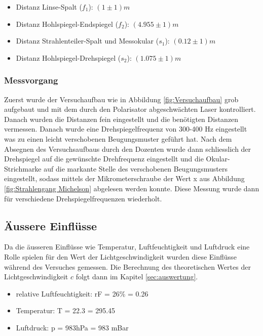 \begin{itemize}
\item Distanz Linse-Spalt ($f_{1}$): $(1\pm 1)m$
\item Distanz Hohlspiegel-Endspiegel ($f_{2}$): $(4.955\pm 1)m$
\item Distanz Strahlenteiler-Spalt und Messokular ($s_{1}$): $(0.12\pm 1)m$
\item Distanz Hohlspiegel-Drehspiegel ($s_{2}$): $(1.075\pm 1)m$
\end{itemize}

\subsubsection{Messvorgang}

Zuerst wurde der Versuchaufbau wie in Abbildung \ref{fig:Versuchaufbau} grob aufgebaut und mit dem durch den Polarisator abgeschwächten Laser kontrolliert. Danach wurden die Distanzen fein eingestellt und die benötigten Distanzen vermessen. Danach wurde eine Drehspiegelfrequenz von 300-400 Hz eingestellt was zu einen leicht verschobenen Beugungsmuster geführt hat. Nach dem Absegnen des Versuchsaufbaus durch den Dozenten wurde dann schliesslich der Drehspiegel auf die gewünschte Drehfrequenz eingestellt und die Okular-Strichmarke auf die markante Stelle des verschobenen Beugungsmusters eingestellt, sodass mittels der Mikrometerschraube der Wert x aus Abbildung \ref{fig:Strahlengang Michelson} abgelesen werden konnte. Diese Messung wurde dann für verschiedene Drehspiegelfrequenzen wiederholt.

\subsection{Äussere Einflüsse}

Da die äusseren Einflüsse wie Temperatur, Luftfeuchtigkeit und Luftdruck eine Rolle spielen für den Wert der Lichtgeschwindigkeit wurden diese Einflüsse während des Versuches gemessen. Die Berechnung des theoretischen Wertes der Lichtgeschwindigkeit $c$ folgt dann im Kapitel \ref{sec:auswertung}.

\begin{itemize}
\item relative Luftfeuchtigkeit: rF = 26\% = 0.26
\item Temperatur: T = 22.3 = 295.45
\item Luftdruck: p = 983hPa = 983 mBar
\end{itemize}